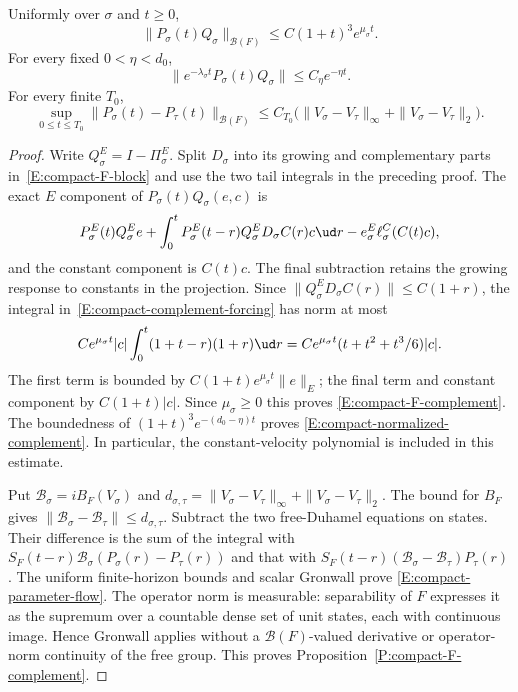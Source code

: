 \begin{proposition}
  \label{P:compact-F-complement}
  Uniformly over $\sigma$ and $t\ge0$,
  \begin{equation}\label{E:compact-F-complement}
    \|P_\sigma(t)Q_\sigma\|_{\mathcal B(F)}
    \le C(1+t)^3e^{\mu_\sigma t}.
  \end{equation}
  For every fixed $0<\eta<d_0$,
  \begin{equation}\label{E:compact-normalized-complement}
    \|e^{-\lambda_\sigma t}P_\sigma(t)Q_\sigma\|
    \le C_\eta e^{-\eta t}.
  \end{equation}
  For every finite $T_0$,
  \begin{equation}\label{E:compact-parameter-flow}
    \sup_{0\le t\le T_0}\|P_\sigma(t)-P_\tau(t)\|_{\mathcal B(F)}
    \le C_{T_0}
    \big(\|V_\sigma-V_\tau\|_\infty+\|V_\sigma-V_\tau\|_2\big).
  \end{equation}
\end{proposition}

\begin{proof}
  Write $Q_\sigma^E=I-\Pi_\sigma^E$. Split $D_\sigma$ into its
  growing and complementary parts in~\eqref{E:compact-F-block}
  and use the two tail integrals in the preceding proof.
  The exact $E$ component of $P_\sigma(t)Q_\sigma(e,c)$ is
  \begin{equation}\label{E:compact-complement-forcing}
    P_\sigma^E(t)Q_\sigma^Ee
    +\int_0^tP_\sigma^E(t-r)Q_\sigma^ED_\sigma C(r)c\ud r
    -e_\sigma^E\ell_\sigma^C(C(t)c),
  \end{equation}
  and the constant component is $C(t)c$. The final subtraction
  retains the growing response to constants in the projection.
  Since $\|Q_\sigma^ED_\sigma C(r)\|\le C(1+r)$, the integral
  in~\eqref{E:compact-complement-forcing} has norm at most
  \[
    Ce^{\mu_\sigma t}|c|
    \int_0^t(1+t-r)(1+r)\ud r
    =Ce^{\mu_\sigma t}(t+t^2+t^3/6)|c|.
  \]
  The first term is bounded by
  $C(1+t)e^{\mu_\sigma t}\|e\|_E$; the final term and constant
  component by $C(1+t)|c|$. Since $\mu_\sigma\ge0$ this proves
  \eqref{E:compact-F-complement}.
  The boundedness of $(1+t)^3e^{-(d_0-\eta)t}$ proves
  \eqref{E:compact-normalized-complement}. In particular, the
  constant-velocity polynomial is included in this estimate.

  Put $\mathcal B_\sigma=iB_F(V_\sigma)$ and
  $d_{\sigma,\tau}=\|V_\sigma-V_\tau\|_\infty+
  \|V_\sigma-V_\tau\|_2$.
  The bound for $B_F$ gives
  $\|\mathcal B_\sigma-\mathcal B_\tau\|\le d_{\sigma,\tau}$.
  Subtract the two free-Duhamel equations on states. Their difference
  is the sum of the integral with
  $S_F(t-r)\mathcal B_\sigma(P_\sigma(r)-P_\tau(r))$ and that with
  $S_F(t-r)(\mathcal B_\sigma-\mathcal B_\tau)P_\tau(r)$.
  The uniform finite-horizon bounds and scalar Gronwall prove
  \eqref{E:compact-parameter-flow}. The operator norm is measurable:
  separability of $F$ expresses it as the supremum over a countable
  dense set of unit states, each with continuous image.
  Hence Gronwall applies without a $\mathcal B(F)$-valued derivative
  or operator-norm continuity of the free group.
  This proves Proposition~\ref{P:compact-F-complement}.
\end{proof}

